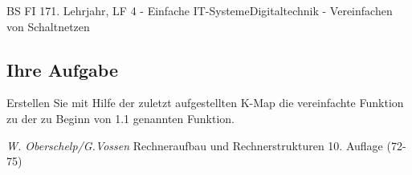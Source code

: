 \documentclass[11pt,twocolumn,oneside,openany,headings=optiontotoc,11pt,numbers=noenddot]{article}
\begin{document}
\begin{worksheet}{BS FI 17}{1. Lehrjahr, LF 4 - Einfache IT-Systeme}{Digitaltechnik - Vereinfachen von Schaltnetzen}
		\subsection*{Ihre Aufgabe} Erstellen Sie mit Hilfe der zuletzt aufgestellten K-Map die vereinfachte Funktion zu der zu Beginn von 1.1 genannten Funktion.
		\par\bigskip\noindent
		\tiny{\color{codegray}\textit{W. Oberschelp/G.Vossen} Rechneraufbau und Rechnerstrukturen 10. Auflage (72-75)}
	\end{worksheet}
\end{document}
